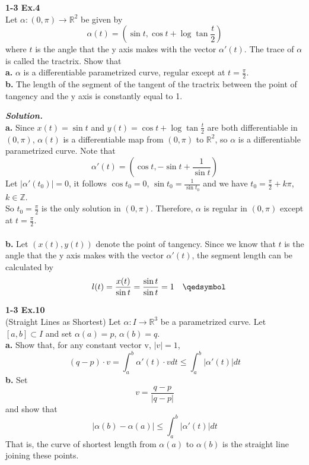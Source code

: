 \documentclass{article}
\begin{document}
\par
\textbf{1-3 Ex.4}\\
Let $\alpha: (0, \pi) \to \mathbb{R}^2$ be given by
$$
    \alpha(t) = (\sin t, \cos t + \log{\tan{\frac{t}{2}}})
$$
where $t$ is the angle that the y axis makes with the vector $\alpha'(t)$. The trace of $\alpha$ is 
called the tractrix. Show that\\
\textbf{a.} $\alpha$ is a differentiable parametrized curve, regular except at $t=\frac{\pi}{2}$.\\
\textbf{b.} The length of the segment of the tangent of the tractrix between the point of tangency and the y
axis is constantly equal to 1.

\par
\textbf{\textit{Solution.}}\\
\textbf{a. }Since $x(t) = \sin t$ and $y(t) = \cos t + \log{\tan{\frac{t}{2}}}$ are both differentiable in $(0, \pi)$,
$\alpha(t)$ is a differentiable map from $(0, \pi)$ to $\mathbb{R}^2$, so $\alpha$ is a differentiable
parametrized curve. Note that
$$
    \alpha'(t) = (\cos t, -\sin t + \frac{1}{\sin t})
$$
Let $|\alpha'(t_0)| = 0$, it follows $\cos t_0 = 0$, $\sin t_0 = \frac{1}{\sin t_0}$ and we have $t_0 = \frac{\pi}{2} + k\pi$, $k \in \mathbb{Z}$.\\
So $t_0 = \frac{\pi}{2}$ is the only solution in $(0, \pi)$. Therefore, $\alpha$ is regular in $(0, \pi)$ except at $t = \frac{\pi}{2}$. \quad \qedsymbol\\\\
\textbf{b. } Let $(x(t), y(t))$ denote the point of tangency. Since we know that $t$ is the angle that the y axis makes with the vector
$\alpha'(t)$, the segment length can be calculated by
$$
    \quad l(t) = \frac{x(t)}{\sin t} = \frac{\sin t}{\sin t} = 1 \quad \qedsymbol
$$

\par
\textbf{1-3 Ex.10}\\
(Straight Lines as Shortest) Let $\alpha: I \to \mathbb{R}^3$ be a parametrized curve. Let $[a, b] \subset I$ and set $\alpha(a) = p$, $\alpha(b) = q$.\\
\textbf{a. }Show that, for any constant vector v, $|v| = 1$,
$$
    (q - p) \cdot v = \int_a^b \alpha'(t) \cdot v dt \leq \int_a^b |\alpha'(t)|dt
$$
\textbf{b. }Set
$$
    v = \frac{q - p}{|q - p|}
$$
and show that
$$
    |\alpha(b) - \alpha(a)| \leq \int_a^b |\alpha'(t)|dt
$$
That is, the curve of shortest length from $\alpha(a)$ to $\alpha(b)$ is the straight line joining these points.
\end{document}
